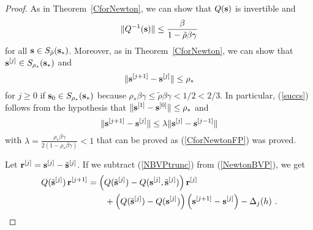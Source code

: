 \begin{proof}
As in Theorem~\ref{CforNewton}, we can show that $Q(\mathbf{s})$ is
invertible and
\[
\| Q^{-1}(\mathbf{s}) \| \leq
\frac{\beta}{1-\tilde{\rho}\beta\gamma}
\]
for all $\mathbf{s} \in S_{\tilde{\rho}}(\mathbf{s}_\ast)$.  Moreover, as in
Theorem~\ref{CforNewton}, we can show that
$\mathbf{s}^{[j]} \in S_{\rho_\ast}(\mathbf{s}_\ast)$ and
\begin{equation}\label{succs}
\| \mathbf{s}^{[j+1]} - \mathbf{s}^{[j]} \| \leq \rho_\ast
\end{equation}
for $j\geq 0$ if $\mathbf{s}_0 \in S_{\rho_\ast}(\mathbf{s}_\ast)$
because $\rho_\ast \beta \gamma \leq \tilde{\rho} \beta \gamma < 1/2 < 2/3$.
In particular, (\ref{succs}) follows from the hypothesis that
$\| \mathbf{s}^{[1]} - \mathbf{s}^{[0]} \| \leq \rho_\ast$ and
\[
\| \mathbf{s}^{[j+1]} - \mathbf{s}^{[j]}\| \leq \lambda \|
\mathbf{s}^{[j]} - \mathbf{s}^{[j-1]} \|
\]
with $\displaystyle \lambda =
\frac{\rho_\ast \beta \gamma}{2(1-\rho_\ast \beta\gamma)} < 1$
that can be proved as (\ref{CforNewtonFP}) was proved.

Let $\mathbf{r}^{[j]} = \mathbf{s}^{[j]} - \tilde{\mathbf{s}}^{[j]}$.   If we subtract
(\ref{NBVPtrunc}) from (\ref{NewtonBVP}), we get
\begin{equation} \label{smx}
\begin{split}
Q(\tilde{\mathbf{s}}^{[j]})\,\mathbf{r}^{[j+1]} &= \left( Q(\tilde{\mathbf{s}}^{[j]}) -
Q(\mathbf{s}^{[j]},\tilde{\mathbf{s}}^{[j]}) \right) \mathbf{r}^{[j]} \\
&\qquad + \left( Q(\tilde{\mathbf{s}}^{[j]}) -Q(\mathbf{s}^{[j]}) \right)
\left( \mathbf{s}^{[j+1]} - \mathbf{s}^{[j]} \right) - \Delta_j(h) \ .
\end{split}
\end{equation}


\end{proof}
